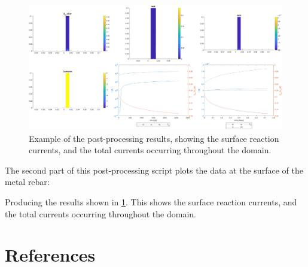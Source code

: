 \documentclass[3p]{elsarticle} %
\newcommand{\CodeSnipU}[4]{}
\begin{document}
\begin{figure}
	\centering
	\includegraphics[width=14cm]{PostProcessingB.eps}
	\caption{Example of the post-processing results, showing the surface reaction currents, and the total currents occurring throughout the domain. }
	\label{fig:PostProcessingB}
\end{figure}

The second part of this post-processing script plots the data at the surface of the metal rebar:
\CodeSnipU{TestCases/ElectroChemistry/PlotData_EChem.m}{102}{114}{TestCases/ElectroChemistry/PlotData\_EChem.m}
Producing the results shown in \cref{fig:PostProcessingB}. This shows the surface reaction currents, and the total currents occurring throughout the domain. 

\FloatBarrier
\section{References}
\renewcommand{\bibsection}{}

\end{document}
